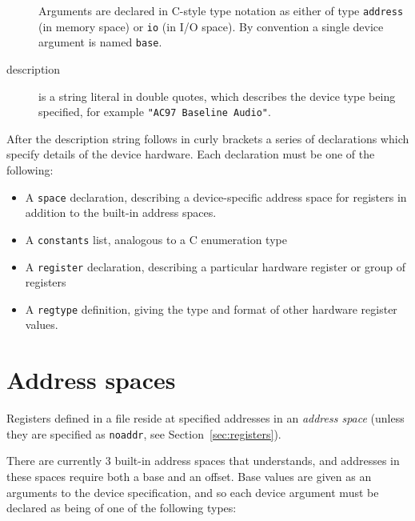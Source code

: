 \documentclass[a4paper,11pt,twoside]{report}
\begin{document}
\begin{description}
  Arguments are declared in C-style type notation as either of type
  \texttt{address} (in memory space) or \texttt{io} (in I/O
  space).  By convention a single device argument is named
  \texttt{base}. 

\item [description] is a string literal in double quotes, which
  describes the device type being specified, for example \texttt{"AC97
  Baseline Audio"}. 

\end{description}

After the description string follows in curly brackets a series of
declarations which specify details of the device hardware.   Each
declaration must be one of the following:

\begin{itemize}

  \item A \texttt{space} declaration, describing a device-specific
    address space for registers in addition to the built-in address
    spaces. 
  
  \item A \texttt{constants} list, analogous to a C enumeration type

  \item A \texttt{register} declaration, describing a particular
    hardware register or group of registers
    
  \item A \texttt{regtype} definition, giving the type and format of
    other hardware register values. 

\end{itemize}

\section{Address spaces}\label{sec:spaces}

Registers defined in a \Mac file
reside at specified addresses in an \emph{address space} (unless they
are specified as \texttt{noaddr}, see Section~\ref{sec:registers}). 

There are currently 3 built-in address spaces that \Mac understands,
and addresses in these spaces require both a base and an offset.  Base 
values are given as an arguments to the device specification, and so
each device argument must be declared as being of one of the following
types: 
\end{document}
